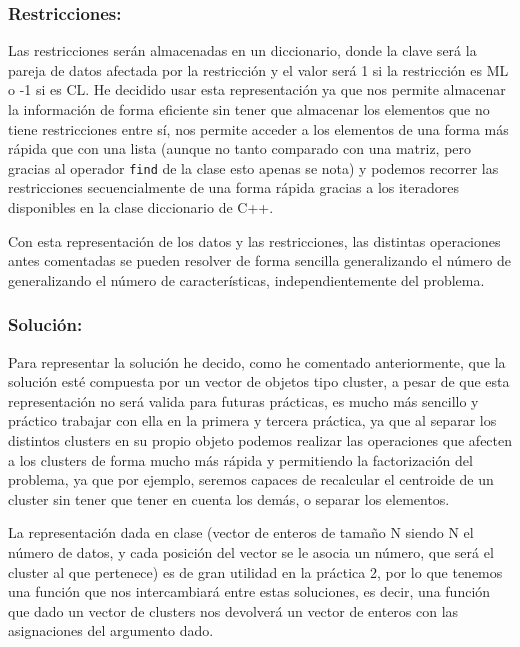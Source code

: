 \documentclass[12pt, spanish]{article}
\begin{document}
\subsubsection{Restricciones:}

Las restricciones serán almacenadas en un diccionario, donde la clave será la pareja de datos afectada por la restricción y el valor será 1 si la restricción es ML o -1 si es CL. He decidido usar esta representación ya que nos permite almacenar la información de forma eficiente sin tener que almacenar los elementos que no tiene restricciones entre sí, nos permite acceder a los elementos de una forma más rápida que con una lista (aunque no tanto comparado con una matriz, pero gracias al operador \texttt{find} de la clase esto apenas se nota) y podemos recorrer las restricciones secuencialmente de una forma rápida gracias a los iteradores disponibles en la clase diccionario de C++.


Con esta representación de los datos y las restricciones, las distintas operaciones antes comentadas se pueden resolver de forma sencilla generalizando el número de generalizando el número de características, independientemente del problema.


\subsubsection{Solución:}

Para representar la solución he decido, como he comentado anteriormente, que la solución esté compuesta por un vector de objetos tipo cluster, a pesar de que esta representación no será valida para futuras prácticas, es mucho más sencillo y práctico trabajar con ella en la primera y tercera práctica, ya que al separar los distintos clusters en su propio objeto podemos realizar las operaciones que afecten a los clusters de forma mucho más rápida y permitiendo la factorización del problema, ya que por ejemplo, seremos capaces de recalcular el centroide de un cluster sin tener que tener en cuenta los demás, o separar los elementos.

La representación dada en clase (vector de enteros de tamaño N siendo N el número de datos, y cada posición del vector se le asocia un número, que será el cluster al que pertenece) es de gran utilidad en la práctica 2, por lo que tenemos una función que nos intercambiará entre estas soluciones, es decir, una función que dado un vector de clusters nos devolverá un vector de enteros con las asignaciones del argumento dado.
\end{document}
